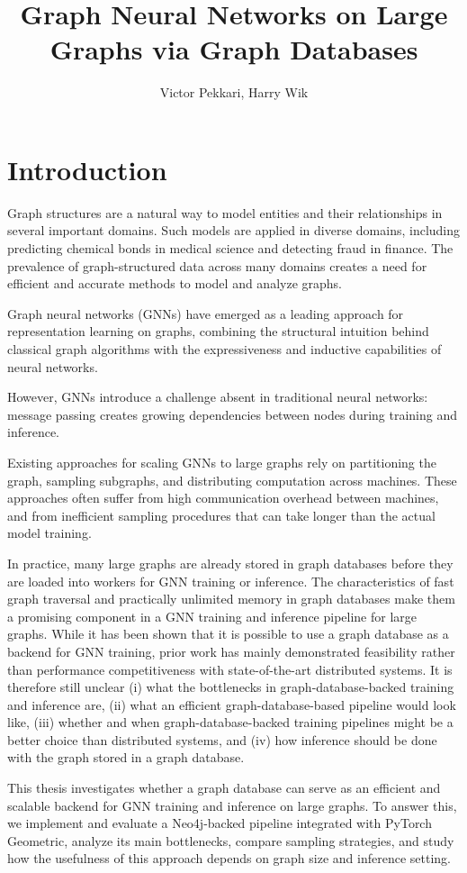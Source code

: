 \documentclass[PhD,single]{uclathes}
\title{Graph Neural Networks on Large Graphs via Graph Databases}
\author{Victor Pekkari, Harry Wik}
\begin{document}
\makeintropages

\chapter{Introduction}

Graph structures are a natural way to model entities and their relationships in
several important domains. Such models are applied in diverse domains, including
predicting chemical bonds in medical science and detecting fraud in finance. The
prevalence of graph-structured data across many domains creates a need for
efficient and accurate methods to model and analyze graphs.

Graph neural networks (GNNs) have emerged as a leading approach for
representation learning on graphs, combining the structural intuition behind
classical graph algorithms with the expressiveness and inductive capabilities of
neural networks.

However, GNNs introduce a challenge absent in traditional neural networks:
message passing creates growing dependencies between nodes during training and
inference.

Existing approaches for scaling GNNs to large graphs rely on partitioning the
graph, sampling subgraphs, and distributing computation across machines. These
approaches often suffer from high communication overhead between machines, and
from inefficient sampling procedures that can take longer than the actual model
training.

In practice, many large graphs are already stored in graph databases before they
are loaded into workers for GNN training or inference. The characteristics of
fast graph traversal and practically unlimited memory in graph databases make
them a promising component in a GNN training and inference pipeline for large
graphs. While it has been shown that it is possible to use a graph database as a
backend for GNN training, prior work has mainly demonstrated feasibility rather
than performance competitiveness with state-of-the-art distributed systems. It
is therefore still unclear (i) what the bottlenecks in graph-database-backed
training and inference are, (ii) what an efficient graph-database-based pipeline
would look like, (iii) whether and when graph-database-backed training
pipelines might be a better choice than distributed systems, and (iv) how
inference should be done with the graph stored in a graph database.

This thesis investigates whether a graph database can serve as an efficient and
scalable backend for GNN training and inference on large graphs. To answer this,
we implement and evaluate a Neo4j-backed pipeline integrated with PyTorch
Geometric, analyze its main bottlenecks, compare sampling strategies, and study
how the usefulness of this approach depends on graph size and inference setting.
\end{document}
